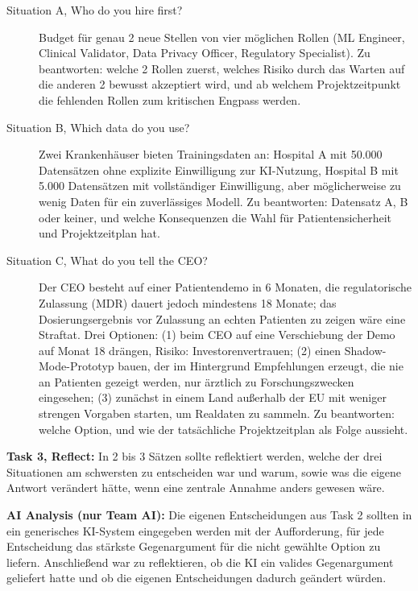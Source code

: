 \begin{description}
    \item[Situation A, Who do you hire first?] Budget für genau 2 neue Stellen von vier möglichen
    Rollen (ML Engineer, Clinical Validator, Data Privacy Officer, Regulatory Specialist). Zu
    beantworten: welche 2 Rollen zuerst, welches Risiko durch das Warten auf die anderen 2 bewusst
    akzeptiert wird, und ab welchem Projektzeitpunkt die fehlenden Rollen zum kritischen Engpass
    werden.
    \item[Situation B, Which data do you use?] Zwei Krankenhäuser bieten Trainingsdaten an:
    Hospital A mit 50.000 Datensätzen ohne explizite Einwilligung zur KI-Nutzung, Hospital B mit
    5.000 Datensätzen mit vollständiger Einwilligung, aber möglicherweise zu wenig Daten für ein
    zuverlässiges Modell. Zu beantworten: Datensatz A, B oder keiner, und welche Konsequenzen die
    Wahl für Patientensicherheit und Projektzeitplan hat.
    \item[Situation C, What do you tell the CEO?] Der CEO besteht auf einer Patientendemo in 6
    Monaten, die regulatorische Zulassung (MDR) dauert jedoch mindestens 18 Monate; das
    Dosierungsergebnis vor Zulassung an echten Patienten zu zeigen wäre eine Straftat. Drei
    Optionen: (1) beim CEO auf eine Verschiebung der Demo auf Monat 18 drängen, Risiko:
    Investorenvertrauen; (2) einen \glqq Shadow-Mode\grqq{}-Prototyp bauen, der im Hintergrund
    Empfehlungen erzeugt, die nie an Patienten gezeigt werden, nur ärztlich zu
    Forschungszwecken eingesehen; (3) zunächst in einem Land außerhalb der EU mit weniger strengen
    Vorgaben starten, um Realdaten zu sammeln. Zu beantworten: welche Option, und wie der
    tatsächliche Projektzeitplan als Folge aussieht.
\end{description}

\textbf{Task 3, Reflect:} In 2 bis 3 Sätzen sollte reflektiert werden, welche der drei Situationen
am schwersten zu entscheiden war und warum, sowie was die eigene Antwort verändert hätte, wenn eine
zentrale Annahme anders gewesen wäre.

\textbf{AI Analysis (nur Team AI):} Die eigenen Entscheidungen aus Task 2 sollten in ein
generisches KI-System eingegeben werden mit der Aufforderung, für jede Entscheidung das stärkste
Gegenargument für die nicht gewählte Option zu liefern. Anschließend war zu reflektieren, ob die KI
ein valides Gegenargument geliefert hatte und ob die eigenen Entscheidungen dadurch geändert
würden.

